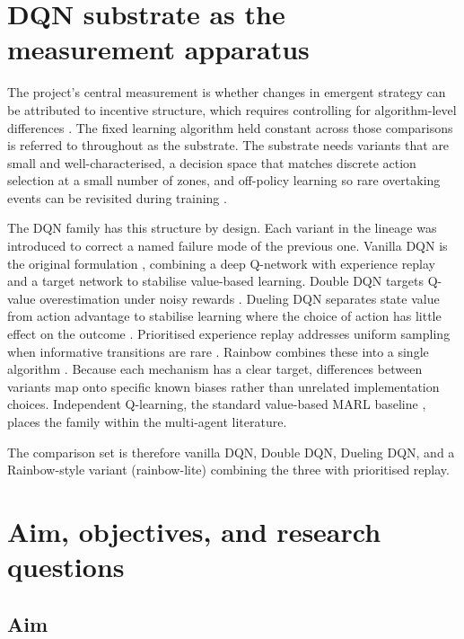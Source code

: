 \section{DQN substrate as the measurement apparatus}
\label{sec:dqn-foundations}

The project's central measurement is whether changes in emergent strategy can be attributed to incentive structure, which requires controlling for algorithm-level differences \citep{henderson2018deep, agarwal2021statistical}. The fixed learning algorithm held constant across those comparisons is referred to throughout as the substrate. The substrate needs variants that are small and well-characterised, a decision space that matches discrete action selection at a small number of zones, and off-policy learning so rare overtaking events can be revisited during training \citep{mnih2015human, schaul2016prioritized}.

The DQN family has this structure by design. Each variant in the lineage was introduced to correct a named failure mode of the previous one. Vanilla DQN is the original formulation \citep{mnih2015human}, combining a deep Q-network with experience replay and a target network to stabilise value-based learning. Double DQN targets Q-value overestimation under noisy rewards \citep{vanhasselt2016double}. Dueling DQN separates state value from action advantage to stabilise learning where the choice of action has little effect on the outcome \citep{wang2016dueling}. Prioritised experience replay addresses uniform sampling when informative transitions are rare \citep{schaul2016prioritized}. Rainbow combines these into a single algorithm \citep{hessel2018rainbow}. Because each mechanism has a clear target, differences between variants map onto specific known biases rather than unrelated implementation choices. Independent Q-learning, the standard value-based MARL baseline \citep{rashid2018qmix}, places the family within the multi-agent literature.

The comparison set is therefore vanilla DQN, Double DQN, Dueling DQN, and a Rainbow-style variant (rainbow-lite) combining the three with prioritised replay.

\section{Aim, objectives, and research questions}

\subsection{Aim}

